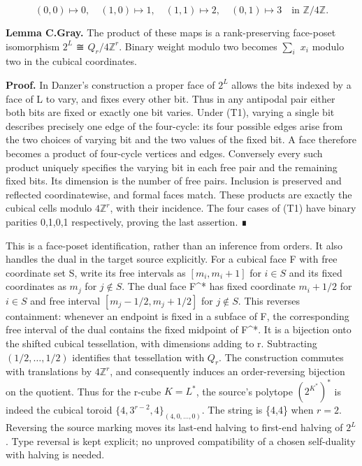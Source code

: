 \documentclass[
  11pt,
  a4paper,
]{article}
\begin{document}
\[
(0,0)\mapsto0,\quad(1,0)\mapsto1,\quad(1,1)\mapsto2,\quad(0,1)\mapsto3
\quad\text{in }\mathbb Z/4\mathbb Z.
\tag{T1}
\]

\textbf{Lemma C.Gray.} The product of these maps is a rank-preserving
face-poset isomorphism \(2^L\) ≅ \(Q_r/4\mathbb Z^r\). Binary weight
modulo two becomes \(\sum _i\) \(x_i\) modulo two in the cubical
coordinates.

\textbf{Proof.} In Danzer's construction a proper face of \(2^L\) allows
the bits indexed by a face of L to vary, and fixes every other bit. Thus
in any antipodal pair either both bits are fixed or exactly one bit
varies. Under (T1), varying a single bit describes precisely one edge of
the four-cycle: its four possible edges arise from the two choices of
varying bit and the two values of the fixed bit. A face therefore
becomes a product of four-cycle vertices and edges. Conversely every
such product uniquely specifies the varying bit in each free pair and
the remaining fixed bits. Its dimension is the number of free pairs.
Inclusion is preserved and reflected coordinatewise, and formal faces
match. These products are exactly the cubical cells modulo
\(4\mathbb Z^r\), with their incidence. The four cases of (T1) have
binary parities 0,1,0,1 respectively, proving the last assertion. ∎

This is a face-poset identification, rather than an inference from
orders. It also handles the dual in the target source explicitly. For a
cubical face F with free coordinate set S, write its free intervals as
\([m_i,m_i+1]\) for \(i\in S\) and its fixed coordinates as \(m_j\) for
\(j\notin S\). The dual face F\^{}* has fixed coordinate \(m_i+1/2\) for
\(i\in S\) and free interval \([m_j-1/2,m_j+1/2]\) for \(j\notin S\).
This reverses containment: whenever an endpoint is fixed in a subface of
F, the corresponding free interval of the dual contains the fixed
midpoint of F\^{}*. It is a bijection onto the shifted cubical
tessellation, with dimensions adding to r. Subtracting
\((1/2,\ldots ,1/2)\) identifies that tessellation with \(Q_r\). The
construction commutes with translations by \(4\mathbb Z^r\), and
consequently induces an order-reversing bijection on the quotient. Thus
for the r-cube \(K=L^*\), the source's polytope \((2^{K^*})^*\) is
indeed the cubical toroid \(\{4,3^{r-2},4\}_{(4,0,\ldots,0)}\). The
string is \{4,4\} when \(r=2\). Reversing the source marking moves its
last-end halving to first-end halving of \(2^L\). Type reversal is kept
explicit; no unproved compatibility of a chosen self-duality with
halving is needed.
\end{document}
